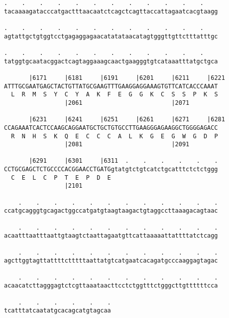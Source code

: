 \documentclass{article}
\begin{document}
\begin{Verbatim}
.    .    .    .    .    .    .    .    .    .    .    .    
tacaaaagatacccatgactttaacaatctcagctcagttaccattagaatcacgtaagg
                                                            
.    .    .    .    .    .    .    .    .    .    .    .    
agtattgctgtggtcctgagaggagaacatatataacatagtgggttgttctttatttgc
                                                            
.    .    .    .    .    .    .    .    .    .    .    .    
tatggtgcaatacggactcagtaggaaagcaactgaagggtgtcataaatttatgctgca
                                                            
       |6171     |6181     |6191     |6201     |6211     |6221
ATTTGCGAATGAGCTACTGTTATGCGAAGTTTGAAGGAGGAAAGTGTTCATCACCCAAAT
  L  R  M  S  Y  C  Y  A  K  F  E  G  G  K  C  S  S  P  K  S
                 |2061                         |2071        
  
       |6231     |6241     |6251     |6261     |6271     |6281
CCAGAAATCACTCCAAGCAGGAATGCTGCTGTGCCTTGAAGGGAGAAGGCTGGGGAGACC
  R  N  H  S  K  Q  E  C  C  C  A  L  K  G  E  G  W  G  D  P
                 |2081                         |2091        
  
       |6291     |6301     |6311  .    .    .    .    .    .
CCTGCGAGCTCTGCCCCACGGAACCTGATGgtatgtctgtcatctgcatttctctctggg
  C  E  L  C  P  T  E  P  D  E                              
                 |2101                                      
  
    .    .    .    .    .    .    .    .    .    .    .    .
ccatgcagggtgcagactggccatgatgtaagtaagactgtaggccttaaagacagtaac
                                                            
    .    .    .    .    .    .    .    .    .    .    .    .
acaatttaatttaattgtaagtctaattagaatgttcattaaaaattattttatctcagg
                                                            
    .    .    .    .    .    .    .    .    .    .    .    .
agcttggtagttattttctttttaattatgtcatgaatcacagatgcccaaggagtagac
                                                            
    .    .    .    .    .    .    .    .    .    .    .    .
acaacatcttagggagtctcgttaaataacttcctctggtttctgggcttgttttttcca
                                                            
    .    .    .    .    .    .
tcatttatcaatatgcacagcatgtagcaa
                              
                              
 

\end{Verbatim}
\end{document}
